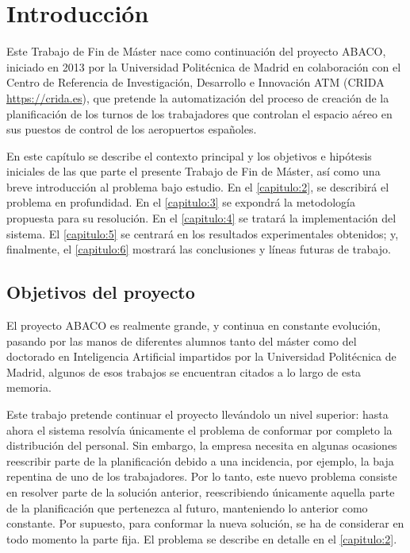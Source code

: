 \graphicspath{{capitulos/Capitulo1-Introduccion/recursos/}}


\section{Introducción}

Este Trabajo de Fin de Máster nace como continuación del proyecto ABACO, iniciado en 2013 por la Universidad Politécnica de Madrid en
colaboración con el Centro de Referencia de Investigación, Desarrollo e Innovación ATM (CRIDA \url{https://crida.es}), que pretende la
automatización del proceso de creación de la planificación de los turnos de los trabajadores que controlan el espacio 
aéreo en sus puestos de control de los aeropuertos españoles.

En este capítulo se describe el contexto principal y los objetivos e hipótesis iniciales de las que parte el presente Trabajo de Fin de Máster, así como una breve introducción al problema bajo estudio.
En el \autoref{capitulo:2}, se describirá el problema en profundidad. En el \autoref{capitulo:3} se expondrá la metodología propuesta para su resolución. En el \autoref{capitulo:4} se tratará la implementación del sistema.
El \autoref{capitulo:5} se centrará en los resultados experimentales obtenidos; y, finalmente, el \autoref{capitulo:6} mostrará las conclusiones y líneas futuras de trabajo. %

\subsection{Objetivos del proyecto}
\label{sec:Objectivos}
El proyecto \gls{ABACO} es realmente grande, y continua en constante evolución, pasando por las manos de 
diferentes alumnos tanto del máster como del doctorado en Inteligencia Artificial impartidos por la Universidad Politécnica de Madrid, algunos de esos trabajos se encuentran citados a lo largo de esta memoria. 

Este trabajo pretende continuar el proyecto llevándolo un nivel superior: hasta ahora el sistema resolvía únicamente el problema de conformar por completo la distribución del personal. 
Sin embargo, la empresa necesita en algunas ocasiones reescribir parte de la planificación debido a una incidencia, por ejemplo, la baja repentina de uno de los trabajadores. Por lo tanto, este nuevo problema consiste en resolver parte de la solución anterior, reescribiendo únicamente aquella parte de la planificación que pertenezca al futuro, manteniendo lo anterior como constante. 
Por supuesto, para conformar la nueva solución, se ha de considerar en todo momento la parte fija. El problema se describe en detalle en el \autoref{capitulo:2}.

